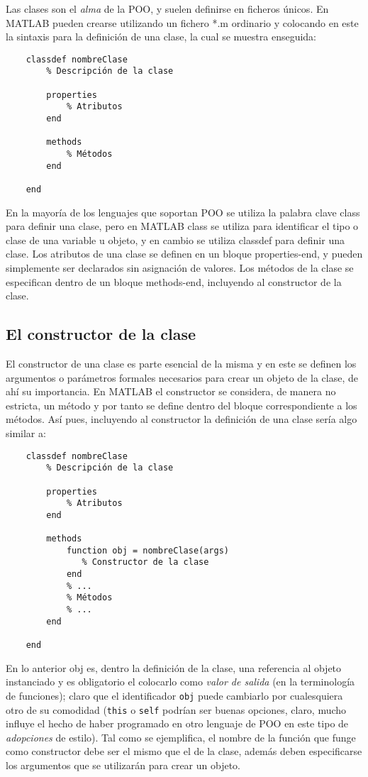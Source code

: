 Las clases son el \textit{alma} de la POO, y suelen definirse en ficheros únicos. En 
MATLAB pueden crearse utilizando un fichero *.m ordinario y colocando en este la 
sintaxis para la definición de una clase, la cual se muestra enseguida:

\begin{verbatim}
	classdef nombreClase
	    % Descripción de la clase
	    
	    properties
	        % Atributos
	    end
	    
	    methods
	        % Métodos
	    end
	    
	end
\end{verbatim}

En la mayoría de los lenguajes que soportan POO se utiliza la palabra clave class 
para definir una clase, pero en MATLAB class se utiliza para identificar el tipo 
o clase de una variable u objeto, y en cambio se utiliza classdef para definir 
una clase. Los atributos de una clase se definen en un bloque properties-end, y 
pueden simplemente ser declarados sin asignación de valores. Los métodos de la 
clase se especifican dentro de un bloque methods-end, incluyendo al constructor 
de la clase.

\subsection{El constructor de la clase}

El constructor de una clase es parte esencial de la misma y en este se definen 
los argumentos o parámetros formales necesarios para crear un objeto de la clase, 
de ahí su importancia. En MATLAB el constructor se considera, de manera no estricta, 
un método y por tanto se define dentro del bloque correspondiente a los métodos. 
Así pues, incluyendo al constructor la definición de una clase sería algo similar a:

\begin{verbatim}
	classdef nombreClase
	    % Descripción de la clase
	    
	    properties
	        % Atributos
	    end
	    
	    methods
	        function obj = nombreClase(args)
	           % Constructor de la clase 
	        end
	        % ...
	        % Métodos
	        % ...
	    end
	    
	end
\end{verbatim}

En lo anterior obj es, dentro la definición de la clase, una referencia al objeto 
instanciado y es obligatorio el colocarlo como \textit{valor de salida} (en la terminología 
de funciones); claro que el identificador \texttt{obj} puede cambiarlo por cualesquiera 
otro de su comodidad (\texttt{this} o \texttt{self} podrían ser buenas opciones, claro, 
mucho influye el hecho de haber programado en otro lenguaje de POO en este tipo de 
\textit{adopciones} de estilo). Tal como se ejemplifica, el nombre de la función que funge 
como constructor debe ser el mismo que el de la clase, además deben especificarse los 
argumentos que se utilizarán para crear un objeto.

